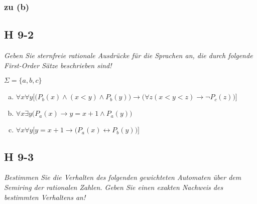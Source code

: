 \documentclass{scrartcl}
\begin{document}
\subsubsection{zu (b)}

\subsection{H 9-2}

\textsl{Geben Sie \emph{sternfreie rationale Ausdrücke} für die Sprachen an, die durch folgende First-Order Sätze beschrieben sind!}

$\Sigma = \big\{a,b,c\big\}$

\begin{enumerate}[(a)]
    \item $\forall x \forall y\Big[\big(P_b(x) \land (x < y) \land P_b(y)\big) \rightarrow \big(\forall z (x < y < z) \rightarrow \lnot P_c(z)\big)\Big]$
    \item $\forall x \exists y \Big( P_a(x) \rightarrow y = x+1 \land P_a(y)\Big)$
    \item $\forall x \forall y \Big[ y = x+1 \rightarrow \big(P_a(x) \leftrightarrow P_b(y)\big)\Big]$
\end{enumerate}

\subsection{H 9-3}

\textsl{Bestimmen Sie die Verhalten des folgenden gewichteten Automaten über dem \emph{Semiring der rationalen Zahlen}. Geben Sie einen exakten Nachweis des bestimmten Verhaltens an!}
\end{document}
